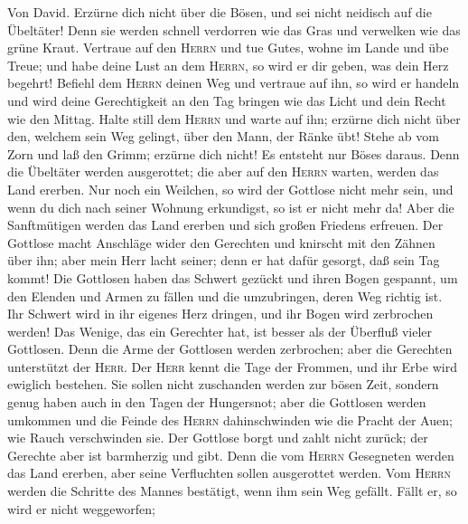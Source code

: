  Von David. Erzürne dich nicht über die Bösen, und sei
nicht neidisch auf die Übeltäter!  Denn sie werden schnell
verdorren wie das Gras und verwelken wie das grüne Kraut. 
Vertraue auf den \textsc{Herrn} und tue Gutes, wohne im Lande und übe
Treue;  und habe deine Lust an dem \textsc{Herrn}, so wird
er dir geben, was dein Herz begehrt!  Befiehl dem
\textsc{Herrn} deinen Weg und vertraue auf ihn, so wird er handeln
 und wird deine Gerechtigkeit an den Tag bringen wie das
Licht und dein Recht wie den Mittag.  Halte still dem
\textsc{Herrn} und warte auf ihn; erzürne dich nicht über den, welchem
sein Weg gelingt, über den Mann, der Ränke übt!  Stehe ab
vom Zorn und laß den Grimm; erzürne dich nicht! Es entsteht nur Böses
daraus.  Denn die Übeltäter werden ausgerottet; die aber
auf den \textsc{Herrn} warten, werden das Land ererben. 
Nur noch ein Weilchen, so wird der Gottlose nicht mehr sein, und wenn du
dich nach seiner Wohnung erkundigst, so ist er nicht mehr da!
 Aber die Sanftmütigen werden das Land ererben und sich
großen Friedens erfreuen.  Der Gottlose macht Anschläge
wider den Gerechten und knirscht mit den Zähnen über ihn;
 aber mein Herr lacht seiner; denn er hat dafür gesorgt,
daß sein Tag kommt!  Die Gottlosen haben das Schwert
gezückt und ihren Bogen gespannt, um den Elenden und Armen zu fällen und
die umzubringen, deren Weg richtig ist.  Ihr Schwert wird
in ihr eigenes Herz dringen, und ihr Bogen wird zerbrochen werden!
 Das Wenige, das ein Gerechter hat, ist besser als der
Überfluß vieler Gottlosen.  Denn die Arme der Gottlosen
werden zerbrochen; aber die Gerechten unterstützt der \textsc{Herr}.
 Der \textsc{Herr} kennt die Tage der Frommen, und ihr
Erbe wird ewiglich bestehen.  Sie sollen nicht zuschanden
werden zur bösen Zeit, sondern genug haben auch in den Tagen der
Hungersnot;  aber die Gottlosen werden umkommen und die
Feinde des \textsc{Herrn} dahinschwinden wie die Pracht der Auen; wie
Rauch verschwinden sie.  Der Gottlose borgt und zahlt
nicht zurück; der Gerechte aber ist barmherzig und gibt. 
Denn die vom \textsc{Herrn} Gesegneten werden das Land ererben, aber
seine Verfluchten sollen ausgerottet werden.  Vom
\textsc{Herrn} werden die Schritte des Mannes bestätigt, wenn ihm sein
Weg gefällt.  Fällt er, so wird er nicht weggeworfen;
